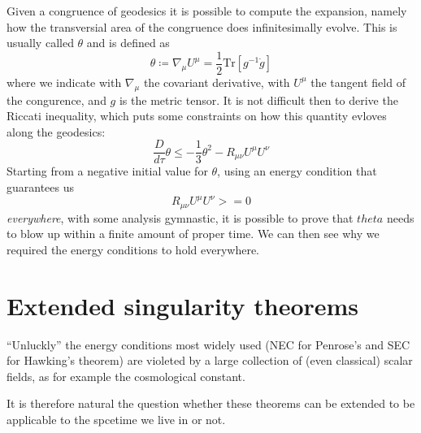 \documentclass[12pt, a4paper]{article}
\begin{document}
Given a congruence of geodesics it is possible to compute the expansion, namely how the transversial area of the congruence does infinitesimally evolve. This is usually called \(\theta\) and is defined as 
\[
\theta \coloneqq \nabla_{\mu} U^{\mu} = \frac{1}{2} \text{Tr}\left[g^{-1}\dot{g}\right]
\]
where we indicate with \(\nabla_{\mu}\) the covariant derivative, with \(U^{\mu}\) the tangent field of the congurence, and \(g\) is the metric tensor.
It is not difficult then to derive the Riccati inequality, which puts some constraints on how this quantity evloves along the geodesics:
\[
\frac{D}{d\tau} \theta \le -\frac{1}{3} \theta ^2 - R_{\mu\nu}U^{\mu}U^{\nu}
\]
Starting from a negative initial value for \(\theta\), using an energy condition that guarantees us 
\[
R_{\mu\nu}U^{\mu}U^{\nu} >=0
\]
\emph{everywhere}, with some analysis gymnastic, it is possible to prove that \(theta\) needs to blow up within a finite amount of proper time.
We can then see why we required the energy conditions to hold everywhere.

\section{Extended singularity theorems}
``Unluckly'' the energy conditions most widely used (NEC for Penrose's and SEC for Hawking's theorem) are violeted by a large collection of (even classical) scalar fields, as for example the cosmological constant.

It is therefore natural the question whether these theorems can be extended to be applicable to the spcetime we live in or not.

\clearpage

\printbibliography
\end{document}
